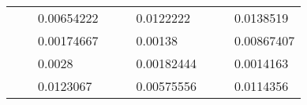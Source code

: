\begin{table}[H]
\begin{tabular}{|cclcclccc}
\rowcolor[HTML]{DAE8FC} 
\multicolumn{1}{|c|}{\cellcolor[HTML]{FFFFC7}}                                & \multicolumn{1}{c|}{\cellcolor[HTML]{DAE8FC}}                      & \multicolumn{1}{l|}{\cellcolor[HTML]{DAE8FC}0.00654222}  & \multicolumn{1}{c|}{\cellcolor[HTML]{FFFFC7}}                                & \multicolumn{1}{c|}{\cellcolor[HTML]{DAE8FC}}                       & \multicolumn{1}{l|}{\cellcolor[HTML]{DAE8FC}0.0122222}   & \multicolumn{1}{c|}{\cellcolor[HTML]{FFFFC7}}                                & \multicolumn{1}{c|}{\cellcolor[HTML]{DAE8FC}}                      & \multicolumn{1}{l|}{\cellcolor[HTML]{DAE8FC}0.0138519}   \\ \cline{3-3} \cline{6-6} \cline{9-9} 
\multicolumn{1}{|c|}{\cellcolor[HTML]{FFFFC7}}                                & \multicolumn{1}{c|}{\cellcolor[HTML]{DAE8FC}}                      & \multicolumn{1}{l|}{\cellcolor[HTML]{DDFDFF}0.00174667}  & \multicolumn{1}{c|}{\cellcolor[HTML]{FFFFC7}}                                & \multicolumn{1}{c|}{\cellcolor[HTML]{DAE8FC}}                       & \multicolumn{1}{l|}{\cellcolor[HTML]{DDFDFF}0.00138}     & \multicolumn{1}{c|}{\cellcolor[HTML]{FFFFC7}}                                & \multicolumn{1}{c|}{\cellcolor[HTML]{DAE8FC}}                      & \multicolumn{1}{l|}{\cellcolor[HTML]{DDFDFF}0.00867407}  \\ \cline{3-3} \cline{6-6} \cline{9-9} 
\rowcolor[HTML]{DAE8FC} 
\multicolumn{1}{|c|}{\cellcolor[HTML]{FFFFC7}}                                & \multicolumn{1}{c|}{\cellcolor[HTML]{DAE8FC}}                      & \multicolumn{1}{l|}{\cellcolor[HTML]{DAE8FC}0.0028}      & \multicolumn{1}{c|}{\cellcolor[HTML]{FFFFC7}}                                & \multicolumn{1}{c|}{\cellcolor[HTML]{DAE8FC}}                       & \multicolumn{1}{l|}{\cellcolor[HTML]{DAE8FC}0.00182444}  & \multicolumn{1}{c|}{\cellcolor[HTML]{FFFFC7}}                                & \multicolumn{1}{c|}{\cellcolor[HTML]{DAE8FC}}                      & \multicolumn{1}{l|}{\cellcolor[HTML]{DAE8FC}0.0014163}   \\ \cline{3-3} \cline{6-6} \cline{9-9} 
\multicolumn{1}{|c|}{\cellcolor[HTML]{FFFFC7}}                                & \multicolumn{1}{c|}{\cellcolor[HTML]{DAE8FC}}                      & \multicolumn{1}{l|}{\cellcolor[HTML]{DDFDFF}0.0123067}   & \multicolumn{1}{c|}{\cellcolor[HTML]{FFFFC7}}                                & \multicolumn{1}{c|}{\cellcolor[HTML]{DAE8FC}}                       & \multicolumn{1}{l|}{\cellcolor[HTML]{DDFDFF}0.00575556}  & \multicolumn{1}{c|}{\cellcolor[HTML]{FFFFC7}}                                & \multicolumn{1}{c|}{\cellcolor[HTML]{DAE8FC}}                      & \multicolumn{1}{l|}{\cellcolor[HTML]{DDFDFF}0.0114356}   \\ \cline{3-3} \cline{6-6} \cline{9-9} 

\end{tabular}
\end{table}
